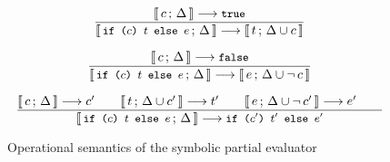 \documentclass[a4paper,twoside]{article}
\newcommand{\lb}[2]{\llbracket\, #1\,;\, #2\, \rrbracket}
\newcommand{\stt}[1]{\texttt{\small{#1}}}
\begin{document}
\begin{figure}[htb]
\begin{framed}
\begin{equation}
\dfrac{
  \lb{c}{\Delta} \longrightarrow \stt{true}
}{
  \lb{\stt{if ($c$) $t$ else $e$}}{\Delta} \longrightarrow \lb{t}{\Delta \cup c}
}
\end{equation}

\begin{equation}
\dfrac{
  \lb{c}{\Delta} \longrightarrow \stt{false}
}{
  \lb{\stt{if ($c$) $t$ else $e$}}{\Delta} \longrightarrow \lb{e}{\Delta \cup \neg \,c}
}
\end{equation}


\begin{equation}
\dfrac{
  \lb{c}{\Delta} \longrightarrow c' \qquad
  \lb{t}{\Delta \cup c'} \longrightarrow t' \qquad
  \lb{e}{\Delta \cup \neg\, c'} \longrightarrow e' \qquad
}{
  \lb{\stt{if ($c$) $t$ else $e$}}{\Delta} \longrightarrow \stt{if ($c'$) $t'$ else $e'$}
}
\end{equation}

\end{framed}
\vspace{-10pt}
\caption{Operational semantics of the symbolic partial evaluator \label{fig:symbolicsem}}
\end{figure}
\end{document}
